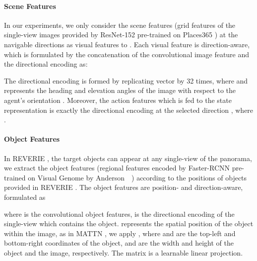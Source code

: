 \documentclass[final]{cvpr}
\DeclareRobustCommand{\star}{\begingroup\normalfont
  \texttt{[image: figures/star.pdf]}\endgroup
}
\begin{document}
\paragraph{Scene Features}
In our experiments, we only consider the scene features (grid features of the single-view images provided by ResNet-152 \cite{he2016deep} pre-trained on Places365 \cite{zhou2017places}) at the navigable directions as visual features to \vlnbert. Each visual feature is direction-aware, which is formulated by the concatenation of the convolutional image feature  and the directional encoding  as:

The directional encoding is formed by replicating vector  by 32 times, where  and  represents the heading and elevation angles of the image with respect to the agent's orientation \cite{fried2018speaker, tan2019learning}. Moreover, the action features  which is fed to the state representation is exactly the directional encoding at the selected direction , where .

\paragraph{Object Features}
In REVERIE \cite{qi2020reverie}, the target objects can appear at any single-view of the panorama, we extract the object features (regional features encoded by Faster-RCNN \cite{ren2015faster} pre-trained on Visual Genome \cite{krishna2017visual} by Anderson~\etal~\cite{anderson2018bottom}) according to the positions of objects provided in REVERIE \cite{qi2020reverie}. The object features are position- and direction-aware, formulated as

where  is the convolutional object features,  is the directional encoding of the single-view which contains the object.  represents the spatial position of the object within the image, as in MATTN \cite{yu2018mattnet}, we apply , where  and  are the top-left and bottom-right coordinates of the object,  and  are the width and height of the object and the image, respectively. The matrix  is a learnable linear projection.





\end{document}
